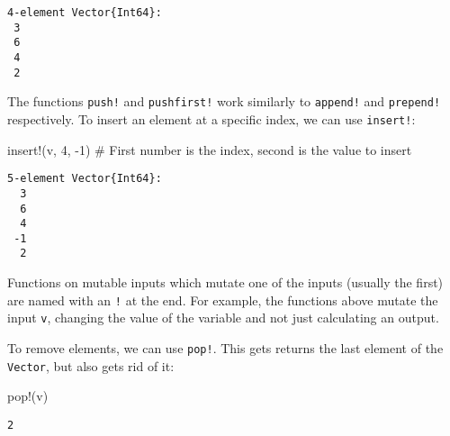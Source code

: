 \documentclass[
  letterpaper,
  DIV=11,
  numbers=noendperiod]{scrreprt}
\newenvironment{Shaded}{\begin{snugshade}}{\end{snugshade}}
\newcommand{\CommentTok}[1]{\textcolor[rgb]{0.37,0.37,0.37}{#1}}
\newcommand{\FloatTok}[1]{\textcolor[rgb]{0.68,0.00,0.00}{#1}}
\newcommand{\FunctionTok}[1]{\textcolor[rgb]{0.28,0.35,0.67}{#1}}
\newcommand{\NormalTok}[1]{\textcolor[rgb]{0.00,0.23,0.31}{#1}}
\newcommand{\OperatorTok}[1]{\textcolor[rgb]{0.37,0.37,0.37}{#1}}
\begin{document}
\begin{verbatim}
4-element Vector{Int64}:
 3
 6
 4
 2
\end{verbatim}

The functions \texttt{push!} and \texttt{pushfirst!} work similarly to
\texttt{append!} and \texttt{prepend!} respectively. To insert an
element at a specific index, we can use \texttt{insert!}:

\begin{Shaded}
\begin{Highlighting}[]
\FunctionTok{insert!}\NormalTok{(v, }\FloatTok{4}\NormalTok{, }\OperatorTok{{-}}\FloatTok{1}\NormalTok{) }\CommentTok{\# First number is the index, second is the value to insert}
\end{Highlighting}
\end{Shaded}

\begin{verbatim}
5-element Vector{Int64}:
  3
  6
  4
 -1
  2
\end{verbatim}

\begin{tcolorbox}[enhanced jigsaw, toprule=.15mm, opacitybacktitle=0.6, leftrule=.75mm, breakable, coltitle=black, bottomrule=.15mm, colbacktitle=quarto-callout-tip-color!10!white, bottomtitle=1mm, rightrule=.15mm, title=\textcolor{quarto-callout-tip-color}{\faLightbulb}\hspace{0.5em}{Convention}, colframe=quarto-callout-tip-color-frame, left=2mm, colback=white, opacityback=0, arc=.35mm, toptitle=1mm, titlerule=0mm]

Functions on mutable inputs which mutate one of the inputs (usually the
first) are named with an \texttt{!} at the end. For example, the
functions above mutate the input \texttt{v}, changing the value of the
variable and not just calculating an output.

\end{tcolorbox}

To remove elements, we can use \texttt{pop!}. This gets returns the last
element of the \texttt{Vector}, but also gets rid of it:

\begin{Shaded}
\begin{Highlighting}[]
\FunctionTok{pop!}\NormalTok{(v)}
\end{Highlighting}
\end{Shaded}

\begin{verbatim}
2
\end{verbatim}
\end{document}
